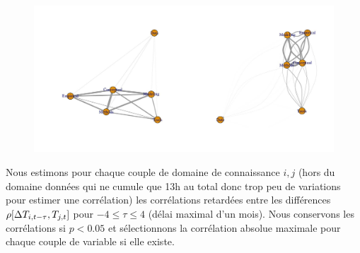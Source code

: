 \begin{figure}
	\includegraphics[width=\linewidth]{Figures/Final/F-reflexivity-kd.jpg}
\end{figure}





Nous estimons pour chaque couple de domaine de connaissance $i,j$ (hors du domaine données qui ne cumule que 13h au total donc trop peu de variations pour estimer une corrélation) les corrélations retardées entre les différences $\rho\!\left[\Delta T_{i,t-\tau},T_{j,t}\right]$ pour $-4 \leq \tau \leq 4$ (délai maximal d'un mois). Nous conservons les corrélations si $p<0.05$ et sélectionnons la corrélation absolue maximale pour chaque couple de variable si elle existe.

